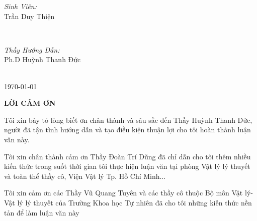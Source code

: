 \documentclass[13pt, a4paper, oneside]{Thesis} %
\begin{document}
\begin{titlepage}
\begin{minipage}{0.4\textwidth}
\begin{flushleft} \large
\emph{Sinh Viên:}\\
Trần Duy Thiện%
\end{flushleft}
\end{minipage}
~
\begin{minipage}{0.4\textwidth}
\begin{flushright} \large
\emph{Thầy Hướng Dẫn:} \\
Ph.D Huỳnh Thanh Đức %
\end{flushright}
\end{minipage}\\[8cm]
{\large \today}\\[2cm] %
\vfill %
\end{titlepage}
\clearpage %

\begin{center}
\fontsize{22pt}{19.5pt} \selectfont
\textbf{LỜI CẢM ƠN}
\end{center}
\fontsize{13pt}{19.5pt} \selectfont

Tôi xin bày tỏ lòng biết ơn chân thành và sâu sắc đến Thầy Huỳnh Thanh Đức, người đã tận tình hướng dẫn và tạo điều kiện thuận lợi cho tôi hoàn thành luận văn này.

Tôi xin chân thành cảm ơn Thầy Đoàn Trí Dũng đã chỉ dẫn cho tôi thêm nhiều kiến thức trong suốt thời gian tôi thực hiện luận văn tại phòng Vật lý lý thuyết và toàn thể thầy cô, Viện Vật lý Tp. Hồ Chí Minh$\dots$

Tôi xin cảm ơn các Thầy Vũ Quang Tuyên và các thầy cô thuộc Bộ môn Vật lý-Vật lý lý thuyết của Trường Khoa học Tự nhiên đã cho tôi những kiến thức nền tản để làm luận văn này
\end{document}
